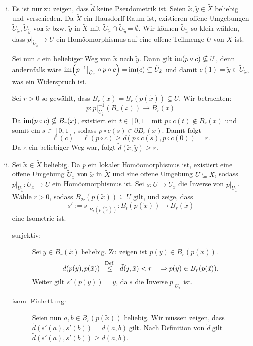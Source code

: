 \begin{beweis}
	\mbox{} \\[-.9cm]
	\begin{enumerate}[(i)]
		\item Es ist nur zu zeigen, dass $\tilde{d}$ keine Pseudometrik ist. 
		Seien $\tilde{x},\tilde{y} \in \tilde{X}$ beliebig und verschieden.
		Da $\tilde{X}$ ein Hausdorff-Raum ist, existieren offene Umgebungen $\tilde{U}_{\tilde{x}}, \tilde{U}_{\tilde{y}}$ von $\tilde{x}$ bzw. $\tilde{y}$ in $\tilde{X}$ mit $\tilde{U}_{\tilde{x}} \cap \tilde{U}_{\tilde{y}} = \emptyset$.
		Wir können $\tilde{U}_{\tilde{x}}$ so klein wählen, dass $p \big|_{\tilde{U}_{\tilde{x}}} \rightarrow U$ ein Homöomorphismus auf eine offene Teilmenge $U$ von $X$ ist.
		
		Sei nun $c$ ein beliebiger Weg von $\tilde{x}$ nach $\tilde{y}$.
		Dann gilt $\operatorname{im}(p \circ c) \nsubseteq U$, denn andernfalls wäre $\im\enbrace*{p^{-1} \big|_{\tilde{U}_{\tilde{x}}} \circ p \circ c} = \im(c) \subseteq \tilde{U}_{\tilde{x}}$ und damit $c(1) = \tilde{y} \in \tilde{U}_{\tilde{x}}$, was ein Widerspruch ist.
		
		Sei $r > 0$ so gewählt, dass $B_r(x) = B_r(p(\tilde{x})) \subseteq U$.
		Wir betrachten:
		\[
			p\colon p \big|_{\tilde{U}_{\tilde{x}}}^{-1} (B_r(x)) \rightarrow B_r(x)
		\]
		Da $\operatorname{im}(p \circ c) \nsubseteq B_r(x)$, existiert ein $t \in [0,1]$ mit $p \circ c(t) \notin B_r(x)$ und somit ein $s \in [0,1]$, sodass $p \circ c(s) \in \partial B_r(x)$.
		Damit folgt
		\[
			\ell(c) = \ell(p \circ c) \geq d(p \circ c (s), p \circ c(0)) = r.
		\]
		Da $c$ ein beliebiger Weg war, folgt $\tilde{d}(\tilde{x},\tilde{y}) \geq r$.
		\item Sei $\tilde{x} \in \tilde{X}$ beliebig.
		Da $p$ ein lokaler Homöomorphismus ist, existiert eine offene Umgebung $\tilde{U}_{\tilde{x}}$ von $\tilde{x}$ in $\tilde{X}$ und eine offene Umgebung $U \subseteq X$, sodass $p \big|_{\tilde{U}_{\tilde{x}}} \colon \tilde{U}_{\tilde{x}} \rightarrow U$ ein Homöomorphismus ist.
		Sei $s \colon U \rightarrow \tilde{U}_{\tilde{x}}$ die Inverse von $p \big|_{\tilde{U}_{\tilde{x}}}$.
		Wähle $r > 0$, sodass $B_{2r}(p(\tilde{x})) \subseteq U$ gilt, und zeige, dass
		\[
			s' := s \big|_{B_r(p(\tilde{x}))} \colon B_r(p(\tilde{x})) \rightarrow B_r(\tilde{x})
		\]
		eine Isometrie ist.
		\begin{description}
			\item[surjektiv:] Sei $y \in B_r(\tilde{x})$ beliebig.
			Zu zeigen ist $p(y) \in B_r(p(\tilde{x}))$.
			\[
				d(p(y),p(\tilde{x})) \stack{\text{Def.}}{\leq} \tilde{d}(y,\tilde{x}) < r \quad \Rightarrow p(y) \in B_r(p(\tilde{x})).
			\] 
			Weiter gilt $s'(p(y)) = y$, da $s$ die Inverse $p\big|_{\tilde{U}_{\tilde{x}}}$ ist.
			\item[isom. Einbettung:] Seien nun $a,b \in B_r(p(\tilde{x}))$ beliebig.
			Wir müssen zeigen, dass $\tilde{d}(s'(a),s'(b)) = d(a,b)$ gilt.
			Nach Definition von $\tilde{d}$ gilt $\tilde{d}(s'(a),s'(b)) \geq d(a,b)$.
			

\end{description}
\end{enumerate}
\end{beweis}
